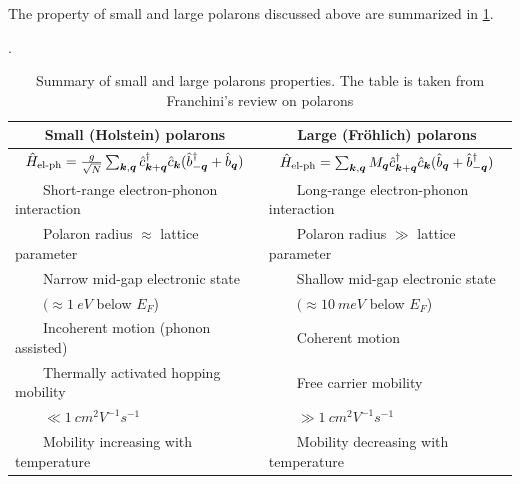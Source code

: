 The property of small and large polarons discussed above are summarized in \cref{tab:small_large}.

\newcommand{\tabitem}{~~\llap{\textbullet}~~}
\begin{table}[p]
    \centering
    \caption{Summary of small and large polarons properties. The table is taken from Franchini's review on polarons \cite{franchini2021b}}.
    \label{tab:small_large}
    \begin{tabular}{ll}
        \toprule
        \multicolumn{1}{c}{
        Small (Holstein) polarons                  }        & \multicolumn{1}{c}{ Large (Fröhlich) polarons                 } \\
        \midrule
        \multicolumn{1}{c}{
        $\hat{H}_\text{el-ph} = \frac{g}{\sqrt{N}}\sum_{\mathbf{\boldsymbol{k}}, \mathbf{\boldsymbol{q}}} \hat{c}^\dagger_{\mathbf{\boldsymbol{k}}+\mathbf{\boldsymbol{q}}} \hat{c}_{\mathbf{\boldsymbol{k}}} (\hat{b}^\dagger_{-\mathbf{\boldsymbol{q}}} + \hat{b}_{\mathbf{\boldsymbol{q}}})$
        }                                                   & \multicolumn{1}{c}{
        $\hat{H}_\text{el-ph} = \sum_{\mathbf{\boldsymbol{k}},\mathbf{\boldsymbol{q}}} M_{\mathbf{\boldsymbol{q}}}\hat{c}^\dagger_{\mathbf{\boldsymbol{k}}+\mathbf{\boldsymbol{q}}}\hat{c}_{\mathbf{\boldsymbol{k}}} (\hat{b}_{\mathbf{\boldsymbol{q}}} + \hat{b}^\dagger_{-\mathbf{\boldsymbol{q}}})$          }
        \\
        \midrule
        \tabitem Short-range electron-phonon interaction    & \tabitem Long-range electron-phonon interaction                 \\
        \tabitem Polaron radius $\approx$ lattice parameter & \tabitem Polaron radius $\gg$ lattice parameter                 \\
        \tabitem Narrow mid-gap electronic state            & \tabitem Shallow mid-gap electronic state                       \\
        $\qquad (\approx \SI{1}{eV}$ below $E_F$)           & $\qquad (\approx \SI{10}{meV}$ below $E_F$)                     \\

        \tabitem Incoherent motion (phonon assisted)        & \tabitem Coherent motion                                        \\
        \tabitem Thermally activated hopping mobility       & \tabitem Free carrier mobility                                  \\
        $\qquad \ll \SI{1}{cm^2 V^{-1} s^{-1}}$             & $\qquad \gg \SI{1}{cm^2 V^{-1} s^{-1}}$                         \\
        \tabitem Mobility increasing with temperature       & \tabitem Mobility decreasing with temperature                   \\
        \bottomrule
    \end{tabular}
\end{table}

